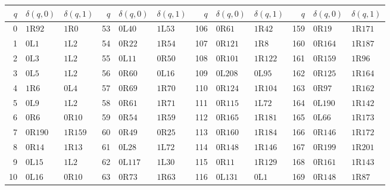 \begingroup
\setlength{\tabcolsep}{3.4pt}
\renewcommand{\arraystretch}{1.03}
\fontsize{8.3}{9.7}\selectfont
\begin{longtable}{@{}rll@{\quad}rll@{\quad}rll@{\quad}rll@{}}
\toprule
$q$ & $\delta(q,0)$ & $\delta(q,1)$ & $q$ & $\delta(q,0)$ & $\delta(q,1)$ & $q$ & $\delta(q,0)$ & $\delta(q,1)$ & $q$ & $\delta(q,0)$ & $\delta(q,1)$\\
\midrule\endhead
0 & $1\mathrm{R}92$ & $1\mathrm{R}0$ & 53 & $0\mathrm{L}40$ & $1\mathrm{L}53$ & 106 & $0\mathrm{R}61$ & $1\mathrm{R}42$ & 159 & $0\mathrm{R}19$ & $1\mathrm{R}171$\\
1 & $0\mathrm{L}1$ & $1\mathrm{L}2$ & 54 & $0\mathrm{R}22$ & $1\mathrm{R}54$ & 107 & $0\mathrm{R}121$ & $1\mathrm{R}8$ & 160 & $0\mathrm{R}164$ & $1\mathrm{R}187$\\
2 & $0\mathrm{L}3$ & $1\mathrm{L}2$ & 55 & $0\mathrm{L}11$ & $0\mathrm{R}50$ & 108 & $0\mathrm{R}101$ & $1\mathrm{R}122$ & 161 & $0\mathrm{R}159$ & $1\mathrm{R}96$\\
3 & $0\mathrm{L}5$ & $1\mathrm{L}2$ & 56 & $0\mathrm{R}60$ & $0\mathrm{L}16$ & 109 & $0\mathrm{L}208$ & $0\mathrm{L}95$ & 162 & $0\mathrm{R}125$ & $1\mathrm{R}164$\\
4 & $1\mathrm{R}6$ & $0\mathrm{L}4$ & 57 & $0\mathrm{R}69$ & $1\mathrm{R}70$ & 110 & $0\mathrm{R}124$ & $1\mathrm{R}104$ & 163 & $0\mathrm{R}97$ & $1\mathrm{R}162$\\
5 & $0\mathrm{L}9$ & $1\mathrm{L}2$ & 58 & $0\mathrm{R}61$ & $1\mathrm{R}71$ & 111 & $0\mathrm{R}115$ & $1\mathrm{L}72$ & 164 & $0\mathrm{L}190$ & $1\mathrm{R}142$\\
6 & $0\mathrm{R}6$ & $0\mathrm{R}10$ & 59 & $0\mathrm{R}54$ & $1\mathrm{R}59$ & 112 & $0\mathrm{R}165$ & $1\mathrm{R}181$ & 165 & $0\mathrm{L}66$ & $1\mathrm{R}173$\\
7 & $0\mathrm{R}190$ & $1\mathrm{R}159$ & 60 & $0\mathrm{R}49$ & $0\mathrm{R}25$ & 113 & $0\mathrm{R}160$ & $1\mathrm{R}184$ & 166 & $0\mathrm{R}146$ & $1\mathrm{R}172$\\
8 & $0\mathrm{R}14$ & $1\mathrm{R}13$ & 61 & $0\mathrm{L}28$ & $1\mathrm{L}72$ & 114 & $0\mathrm{R}148$ & $1\mathrm{R}146$ & 167 & $0\mathrm{R}199$ & $1\mathrm{R}201$\\
9 & $0\mathrm{L}15$ & $1\mathrm{L}2$ & 62 & $0\mathrm{L}117$ & $1\mathrm{L}30$ & 115 & $0\mathrm{R}11$ & $1\mathrm{R}129$ & 168 & $0\mathrm{R}161$ & $1\mathrm{R}143$\\
10 & $0\mathrm{L}16$ & $0\mathrm{R}10$ & 63 & $0\mathrm{R}73$ & $1\mathrm{R}63$ & 116 & $0\mathrm{L}131$ & $0\mathrm{L}1$ & 169 & $0\mathrm{R}148$ & $1\mathrm{R}87$\\

\end{longtable}

